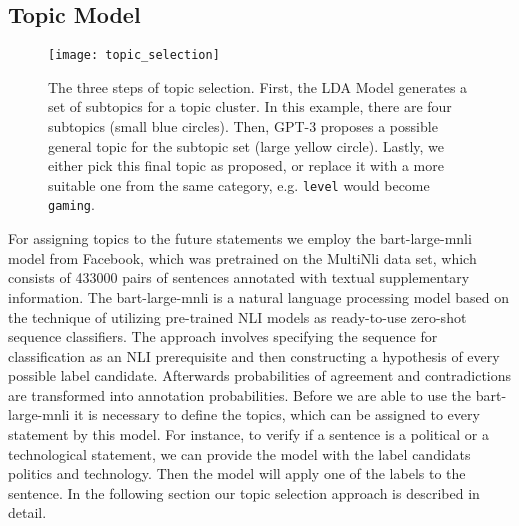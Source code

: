 \subsection{Topic Model}
\label{topic-model}
\begin{figure}[t]
    \centering
    \texttt{[image: topic\_selection]}
    \caption{
        The three steps of topic selection.
        First, the LDA Model generates a set of subtopics for a topic cluster.
        In this example, there are four subtopics (small blue circles).
        Then, GPT-3 proposes a possible general topic for the subtopic set (large yellow circle).
        Lastly, we either pick this final topic as proposed, or replace it with a more suitable one from the same category, e.g. \texttt{level} would become \texttt{gaming}.
    }
    \label{fig:topic_selection}
\end{figure}
For assigning topics to the future statements we employ the bart-large-mnli model from Facebook, which was pretrained on the MultiNli \citep{N18-1101} data set, which consists of 433000 pairs of sentences annotated with textual supplementary information. The bart-large-mnli is a natural language processing model based on the technique of \citet{yin2019benchmarking} utilizing pre-trained NLI models as ready-to-use zero-shot sequence classifiers.
The approach involves specifying the sequence for classification as an NLI prerequisite and then constructing a hypothesis of every possible label candidate.
Afterwards probabilities of agreement and contradictions are transformed into annotation probabilities.
Before we are able to use the bart-large-mnli it is necessary to define the topics, which can be assigned to every statement by this model.
For instance, to verify if a sentence is a political or a technological statement, we can provide the model with the label candidats politics and technology. Then the model will apply one of the labels to the sentence.
In the following section our topic selection approach is described in detail.

